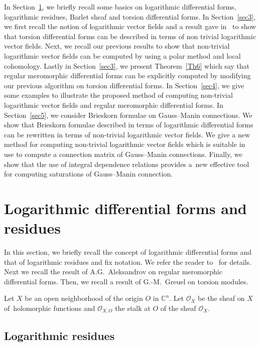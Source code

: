 \documentclass[10pt,a4paper]{amsart}
\numberwithin{equation}{section}
\begin{document}
In Section~\ref{sec2}, we briefly recall some basics on logarithmic differential forms,
logarithmic residues, Barlet sheaf and torsion differential forms.
In Section~\ref{sec3}, we first recall the notion of logarithmic vector fields and a result
gave in~\cite{TN20} to show that torsion differential forms can be described
in terms of non trivial logarithmic vector fields. Next, we recall our previous
results to show that non-trivial logarithmic vector fields can be computed
by using a polar method and local cohomology. Lastly in Section~\ref{sec3}, we present
Theorem~\ref{Th6} which say that regular meromorphic differential forms can be
explicitly computed by modifying our previous algorithm on torsion differential
forms.
In Section~\ref{sec4}, we give some examples to illustrate the proposed method of computing
non-trivial logarithmic vector fields and regular meromorphic differential forms.
In Section~\ref{sec5}, we consider Brieskorn formulae on Gauss--Manin connections. We show
that Brieskorn formulae described in terms of logarithmic differential forms can be
rewritten in terms of non-trivial logarithmic vector fields. We give a new method for computing
non-trivial logarithmic vector fields which is suitable in use to compute a connection
matrix of Gauss--Manin connections. Finally, we show that the use of integral dependence relations
provides a~new effective tool for computing saturations of Gauss--Manin connection.

\section{Logarithmic differential forms and residues}\label{sec2}

In this section, we briefly recall the concept of logarithmic differential forms and that of loga\-rithmic residues and fix notation. We refer the reader to~\cite{S} for details. Next we recall the result of A.G.~Aleksandrov on regular meromorphic differential forms. Then, we recall a result of
G.-M.~Greuel on torsion modules.

Let $X$ be an open neighborhood of the origin $O$ in $ {\mathbb C}^n$. Let $ {\mathcal O}_X $ be the sheaf on $ X $ of~holo\-morphic functions and $ {\mathcal O}_{X,O} $ the stalk at $ O $ of the sheaf $ {\mathcal O}_X$.

\subsection{Logarithmic residues}
\end{document}
